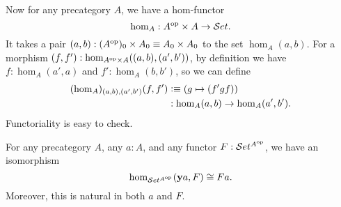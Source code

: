 \documentclass[hott-all.tex]{subfiles}
\begin{document}
Now for any precategory $A$, we have a hom-functor
%
\[\hom_A : A^{\mathrm{op}} \times A \to \mathcal{S}et.\]
It takes a pair $(a,b): (A^{\mathrm{op}})_0 \times A_0 \equiv A_0 \times A_0$ to the set $\hom_A(a,b)$.
For a morphism $(f,f') : \hom_{A^{\mathrm{op}}\times A}((a,b),(a',b'))$, by definition we have $f:\hom_A(a',a)$ and $f':\hom_A(b,b')$, so we can define
\begin{align*}
  (\hom_A)_{(a,b),(a',b')}(f,f')
  &\vcentcolon\equiv (g \mapsto (f'gf))\\
  &: \hom_A(a,b) \to \hom_A(a',b').
\end{align*}
Functoriality is easy to check.

%
\begin{thm}\label{ct:yoneda}
  For any precategory $A$, any $a:A$, and any functor $F:\mathcal{S}et^{A^{\mathrm{op}}}$, we have an isomorphism
  \begin{equation}\label{eq:yoneda}
    \hom_{\uset^{A\op}}(\y a, F) \cong Fa.
  \end{equation}
  Moreover, this is natural in both $a$ and $F$.
\end{thm}
%
%
\end{document}
